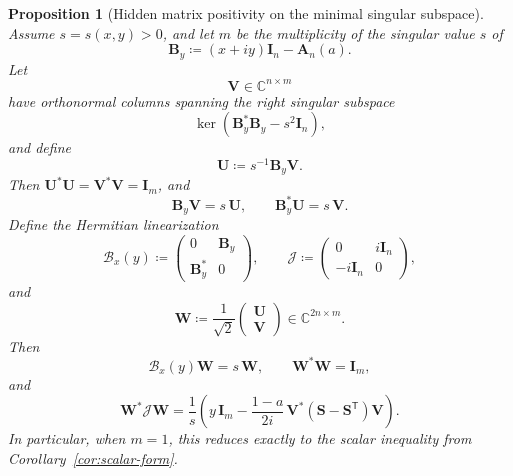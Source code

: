 \documentclass[11pt]{article}
\newtheorem{proposition}[theorem]{Proposition}
\begin{document}
\begin{proposition}[Hidden matrix positivity on the minimal singular subspace]\label{prop:hidden-matrix-positivity}
Assume \(s=s(x,y)>0\), and let \(m\) be the multiplicity of the singular value \(s\) of
\[
\mathbf B_y\coloneqq (x+iy)\mathbf I_n-\mathbf A_n(a).
\]
Let
\[
\mathbf V\in\mathbb C^{n\times m}
\]
have orthonormal columns spanning the right singular subspace
\[
\ker(\mathbf B_y^*\mathbf B_y-s^2\mathbf I_n),
\]
and define
\[
\mathbf U\coloneqq s^{-1}\mathbf B_y\mathbf V.
\]
Then \(\mathbf U^*\mathbf U=\mathbf V^*\mathbf V=\mathbf I_m\), and
\[
\mathbf B_y\mathbf V=s\,\mathbf U,
\qquad
\mathbf B_y^*\mathbf U=s\,\mathbf V.
\]
Define the Hermitian linearization
\[
\mathcal B_x(y)\coloneqq
\begin{pmatrix}
0 & \mathbf B_y\\
\mathbf B_y^* & 0
\end{pmatrix},
\qquad
\mathcal J\coloneqq
\begin{pmatrix}
0 & i\mathbf I_n\\
-i\mathbf I_n & 0
\end{pmatrix},
\]
and
\[
\mathbf W\coloneqq \frac{1}{\sqrt2}\begin{pmatrix}\mathbf U\\[1mm]\mathbf V\end{pmatrix}\in\mathbb C^{2n\times m}.
\]
Then
\[
\mathcal B_x(y)\mathbf W=s\,\mathbf W,
\qquad
\mathbf W^*\mathbf W=\mathbf I_m,
\]
and
\[
\boxed{
\mathbf W^*\mathcal J\mathbf W
=
\frac1s
\left(
y\,\mathbf I_m
-
\frac{1-a}{2i}\,\mathbf V^*(\mathbf S-\mathbf S^{\mathsf T})\mathbf V
\right).
}
\]
In particular, when \(m=1\), this reduces exactly to the scalar inequality from Corollary~\ref{cor:scalar-form}.
\end{proposition}
\end{document}
